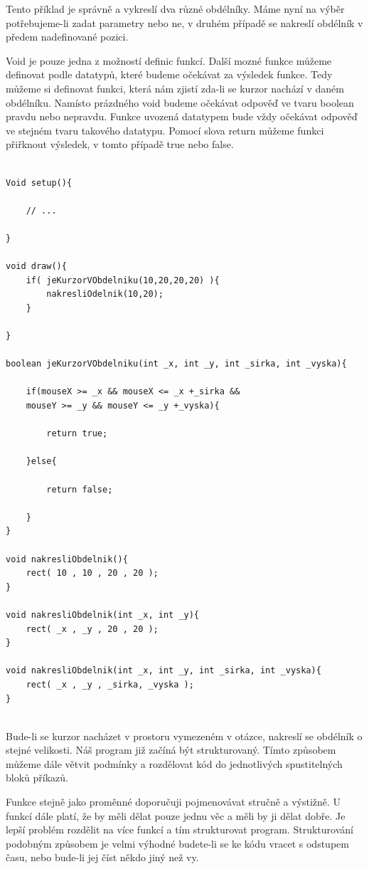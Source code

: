 \documentclass[10pt]{book}
\begin{document}
Tento příklad je správně a vykreslí dva různé obdélníky. Máme nyní na výběr potřebujeme-li zadat parametry nebo ne, v druhém případě se nakreslí obdélník v předem nadefinované pozici.


Void je pouze jedna z možností definic funkcí. Další mozné funkce můžeme definovat podle datatypů, které budeme očekávat za výsledek funkce. Tedy můžeme si definovat funkci, která nám zjistí zda-li se kurzor nachází v daném obdélníku. Namísto prázdného void budeme očekávat odpověď ve tvaru boolean pravdu nebo nepravdu. Funkce uvozená datatypem bude vždy očekávat odpověď ve stejném tvaru takového datatypu. Pomocí slova return můžeme funkci přiřknout výsledek, v tomto případě true nebo false.

\begin{lstlisting}

Void setup(){

	// ...

}

void draw(){
	if( jeKurzorVObdelniku(10,20,20,20) ){
		nakresliOdelnik(10,20);
	}

}

boolean jeKurzorVObdelniku(int _x, int _y, int _sirka, int _vyska){
	
	if(mouseX >= _x && mouseX <= _x +_sirka &&
	mouseY >= _y && mouseY <= _y +_vyska){
	
		return true;
	
	}else{
	
		return false;
	
	}
}

void nakresliObdelnik(){
	rect( 10 , 10 , 20 , 20 );
}

void nakresliObdelnik(int _x, int _y){
	rect( _x , _y , 20 , 20 );
}

void nakresliObdelnik(int _x, int _y, int _sirka, int _vyska){
	rect( _x , _y , _sirka, _vyska );
}


\end{lstlisting}


Bude-li se kurzor nacházet v prostoru vymezeném v otázce, nakreslí se obdélník o stejné velikosti. Náš program již začíná být strukturovaný. Tímto způsobem můžeme dále větvit podmínky a rozdělovat kód do jednotlivých spustitelných bloků příkazů.

Funkce stejně jako proměnné doporučuji pojmenovávat stručně a výstižně. U funkcí dále platí, že by měli dělat pouze jednu věc a měli by ji dělat dobře. Je lepší problém rozdělit na více funkcí a tím  strukturovat program. Strukturování podobným způsobem je velmi výhodné budete-li se ke kódu vracet s odstupem času, nebo bude-li jej číst někdo jiný než vy.
\end{document}
